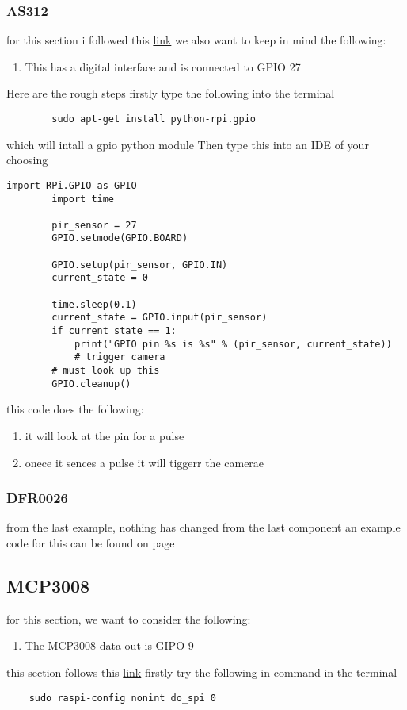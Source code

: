 	\subsubsection{AS312}
	for this section i followed  this \href{https://pimylifeup.com/raspberry-pi-motion-sensor/}{link}
	we also want to keep in mind the following:
	\begin{enumerate}
		\item This has a  digital interface and is connected  to GPIO 27 
	\end{enumerate}
	Here are the rough steps firstly  type the following into the  terminal 
	\begin{verbatim}
		sudo apt-get install python-rpi.gpio
	\end{verbatim}
	which will  intall a gpio python module
	\newpage
	Then type this into an IDE of your  choosing
	\begin{lstlisting}[style=mystyle,caption={Example code for AS312}]
		import RPi.GPIO as GPIO
		import time

		pir_sensor = 27
		GPIO.setmode(GPIO.BOARD)

		GPIO.setup(pir_sensor, GPIO.IN)
		current_state = 0
		
		time.sleep(0.1)
		current_state = GPIO.input(pir_sensor)
		if current_state == 1:
			print("GPIO pin %s is %s" % (pir_sensor, current_state))
			# trigger camera
		# must look up this 
		GPIO.cleanup()
	\end{lstlisting}
	this code does the  following:
	\begin{enumerate}
		\item it will look at the  pin for a pulse 
		\item onece it sences a pulse  it will tiggerr  the camerae
	\end{enumerate}
	\subsubsection{DFR0026}	
	from the last example, nothing has changed from the last component
	an example code for this can be found on page \pageref{adc code}
	\subsection{MCP3008}
	for this section, we want to consider the following:
	\begin{enumerate}
		\item The MCP3008 data out is GIPO 9 
	\end{enumerate}
	this section follows this \href{https://randomnerdtutorials.com/raspberry-pi-analog-inputs-python-mcp3008/}{link}
	firstly try the following in command in the terminal 
	\begin{verbatim}
	sudo raspi-config nonint do_spi 0
	\end{verbatim}
	
